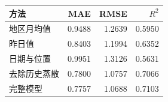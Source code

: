 \begin{tabular}{lrrr}
\toprule
方法 & MAE & RMSE & $R^2$ \\
\midrule
地区月均值 & 0.9488 & 1.2639 & 0.5950 \\
昨日值 & 0.8403 & 1.1994 & 0.6352 \\
日期与位置 & 0.9951 & 1.3126 & 0.5631 \\
去除历史蒸散 & 0.7800 & 1.0757 & 0.7066 \\
完整模型 & 0.7757 & 1.0688 & 0.7103 \\
\bottomrule
\end{tabular}